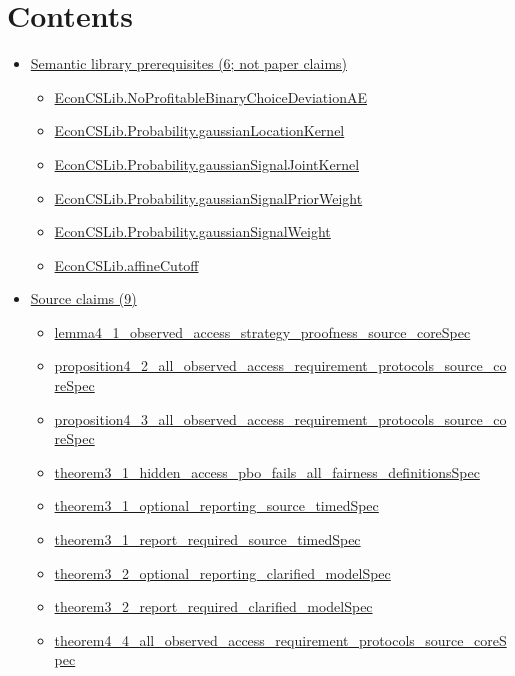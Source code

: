 \documentclass[10pt]{article}
\begin{document}
\section*{Contents}
\begin{itemize}[leftmargin=1.2em]
\item \hyperlink{library-section-8c5533201d4a4697}{Semantic library prerequisites (6; not paper claims)}
\begin{itemize}[leftmargin=1.2em]
\item \hyperlink{library-prerequisite-46da532c08035fe0}{EconCSLib.NoProfitableBinaryChoiceDeviationAE}
\item \hyperlink{library-prerequisite-86745506f59e7383}{EconCSLib.Probability.gaussianLocationKernel}
\item \hyperlink{library-prerequisite-468cb39a4fc9f0a8}{EconCSLib.Probability.gaussianSignalJointKernel}
\item \hyperlink{library-prerequisite-a8b30bb300e5b862}{EconCSLib.Probability.gaussianSignalPriorWeight}
\item \hyperlink{library-prerequisite-7f6486994fd09e90}{EconCSLib.Probability.gaussianSignalWeight}
\item \hyperlink{library-prerequisite-63da31a93aabcfaf}{EconCSLib.affineCutoff}
\end{itemize}
\item \hyperlink{source-section-f10b5f68e4acf3dc}{Source claims (9)}
\begin{itemize}[leftmargin=1.2em]
\item \hyperlink{source-claim-47d64178a8b01b72}{lemma4\_1\_observed\_access\_strategy\_proofness\_source\_coreSpec}
\item \hyperlink{source-claim-967753ba3a07fa47}{proposition4\_2\_all\_observed\_access\_requirement\_protocols\_source\_coreSpec}
\item \hyperlink{source-claim-28b3cd5bec7dd4f5}{proposition4\_3\_all\_observed\_access\_requirement\_protocols\_source\_coreSpec}
\item \hyperlink{source-claim-c1ab3f67a9da6144}{theorem3\_1\_hidden\_access\_pbo\_fails\_all\_fairness\_definitionsSpec}
\item \hyperlink{source-claim-6c73f99151b1b2c7}{theorem3\_1\_optional\_reporting\_source\_timedSpec}
\item \hyperlink{source-claim-017682a01e0507bb}{theorem3\_1\_report\_required\_source\_timedSpec}
\item \hyperlink{source-claim-1fc46568cc4fe01e}{theorem3\_2\_optional\_reporting\_clarified\_modelSpec}
\item \hyperlink{source-claim-7d055230dc3ae301}{theorem3\_2\_report\_required\_clarified\_modelSpec}
\item \hyperlink{source-claim-1113264c00211bf2}{theorem4\_4\_all\_observed\_access\_requirement\_protocols\_source\_coreSpec}
\end{itemize}
\end{itemize}
\end{document}
